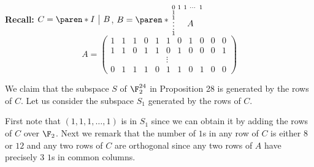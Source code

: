 \textbf{Recall: }$C=\paren*{\begin{array}{@{}c|c@{}}
I & B
\end{array}}$, $B=\paren*{\begin{smallmatrix}0 & 1 & 1 & \cdots & 1 \\
1 & & & & \\
1 & & & & \\[-1ex]
\vdots & & \raisebox{1ex}{\rule{1ex}{0ex}\rlap{$A$}} & & \\
1 & & & & \end{smallmatrix}}$
\[ A = \begin{pmatrix}
1 & 1 & 1 & 0 & 1 & 1 & 0 & 1 & 0 & 0 & 0 \\
1 & 1 & 0 & 1 & 1 & 0 & 1 & 0 & 0 & 0 & 1 \\
 & & & & &\vdots& & & & & \\
0 & 1 & 1 & 1 & 0 & 1 & 1 & 0 & 1 & 0 & 0
\end{pmatrix} \]

We claim that the subspace $S$ of $\F_2^{24}$ in Proposition 28 is generated by the rows of $C$.  Let us consider the subspace $S_1$ generated by the rows of $C$.

First note that $(1,1,1,\dotsc,1)$ is in $S_1$ since we can obtain it by adding the rows of $C$ over $\F_2$.  Next we remark that the number of $1$s in any row of $C$ is either $8$ or $12$ and any two rows of $C$ are orthogonal since any two rows of $A$ have precisely 3 $1$s in common columns.

